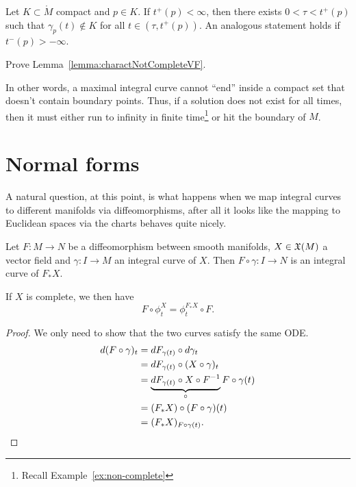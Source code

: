 \begin{lemma}\label{lemma:charactNotCompleteVF}
	Let $K\subset \mathring M$ compact and $p\in K$.
	If $t^+(p) < \infty$, then there exists $0<\tau<t^+(p)$ such that $\gamma_p(t)\not\in K$ for all $t\in (\tau, t^+(p))$.
	An analogous statement holds if $t^-(p) > -\infty$.
\end{lemma}

\begin{exercise}
	Prove Lemma~\ref{lemma:charactNotCompleteVF}.
\end{exercise}

In other words, a maximal integral curve cannot ``end'' inside a compact set that doesn't contain boundary points.
Thus, if a solution does not exist for all times, then it must either run to infinity in finite time\footnote{Recall Example~\ref{ex:non-complete}} or hit the boundary of $M$.

\section{Normal forms}

A natural question, at this point, is what happens when we map integral curves to different manifolds via diffeomorphisms, after all it looks like the mapping to Euclidean spaces via the charts behaves quite nicely.

\begin{proposition}\label{prop:conjpfX}
	Let $F: M \to N$ be a diffeomorphism between smooth manifolds, $X\in\mathfrak{X}(M)$ a vector field and $\gamma:I\to M$ an integral curve of $X$. Then $F\circ\gamma : I \to N$ is an integral curve of $F_* X$.

	If $X$ is complete, we then have
	\begin{equation}
		F\circ\phi_t^X = \phi_t^{F_* X}\circ F.
	\end{equation}
\end{proposition}
\begin{proof}
	We only need to show that the two curves satisfy the same ODE.
	\begin{align*}
		d(F\circ \gamma)_t
		 & = dF_{\gamma(t)} \circ d\gamma_t                                                \\
		 & = dF_{\gamma(t)} \circ (X \circ \gamma)_t                                       \\
		 & = \underbrace{dF_{\gamma(t)} \circ X \circ F^{-1}}_{\circ} F \circ \gamma(t) \\
		 & = (F_* X) \circ (F\circ \gamma)(t)                                              \\
		 & = (F_* X)_{F\circ\gamma(t)}.
	\end{align*}
\end{proof}


